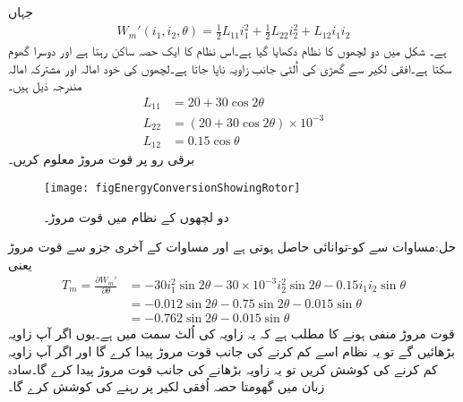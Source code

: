 جہاں
\begin{align}\label{مساوات_تبادلہ_کوتوانائی_از_خود}
W_m'(i_1,i_2,\theta)=\frac{1}{2} L_{11} i_1^2+\frac{1}{2} L_{22} i_2^2+L_{12} i_1 i_2
\end{align}
ہے۔
%
شکل   میں دو لچھوں کا نظام دکھایا گیا ہے۔اس نظام کا ایک حصہ ساکن رہتا ہے اور دوسرا گھوم سکتا ہے۔افقی لکیر سے گھڑی کی اُلٹی جانب زاویہ   ناپا جاتا ہے۔لچھوں کی خود امالہ اور مشترکہ امالہ مندرجہ ذیل ہیں۔
\begin{align*}
L_{11}&=20+30\cos 2 \theta\\
L_{22}&=\left(20+30\cos 2\theta \right) \times 10^{-3}\\
L_{12}&=0.15 \cos \theta
\end{align*}
 برقی رو   پر قوت مروڑ  معلوم کریں۔
\begin{figure}
\centering
\texttt{[image: figEnergyConversionShowingRotor]}
\caption{دو لچھوں کے نظام میں قوت مروڑ۔}
\label{شکل_تبادلہ_توانائی_دو_لچھوں_میں_مروڑ}
\end{figure}

حل:مساوات  سے کو-توانائی حاصل ہوتی ہے اور مساوات   کے آخری جزو سے قوت مروڑ یعنی
\begin{align*}
T_m=\frac{\partial W_m'}{\partial \theta}&=-30 i_1^2 \sin 2 \theta-30\times 10^{-3} i_2^2 \sin 2 \theta -0.15 i_1 i_2 \sin \theta\\
&=-0.012 \sin 2 \theta-0.75 \sin 2 \theta-0.015 \sin \theta\\
&=-0.762 \sin 2 \theta-0.015 \sin \theta
\end{align*}
قوت مروڑ منفی ہونے کا مطلب ہے کہ یہ زاویہ کی اُلٹ سمت میں ہے۔یوں اگر آپ زاویہ بڑھائیں گے تو یہ نظام اسے کم کرنے کی جانب قوت مروڑ پیدا کرے گا اور اگر آپ زاویہ کم کرنے کی کوشش کریں تو یہ زاویہ بڑھانے کی جانب قوت مروڑ پیدا کرے گا۔سادہ زبان میں گھومتا حصہ اُفقی لکیر پر رہنے کی کوشش کرے گا۔
